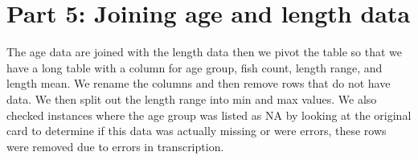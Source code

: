 \documentclass[
]{article}
\begin{document}
\hypertarget{part-5-joining-age-and-length-data}{%
\section{Part 5: Joining age and length
data}\label{part-5-joining-age-and-length-data}}

The age data are joined with the length data then we pivot the table so
that we have a long table with a column for age group, fish count,
length range, and length mean. We rename the columns and then remove
rows that do not have data. We then split out the length range into min
and max values. We also checked instances where the age group was listed
as NA by looking at the original card to determine if this data was
actually missing or were errors, these rows were removed due to errors
in transcription.
\end{document}
